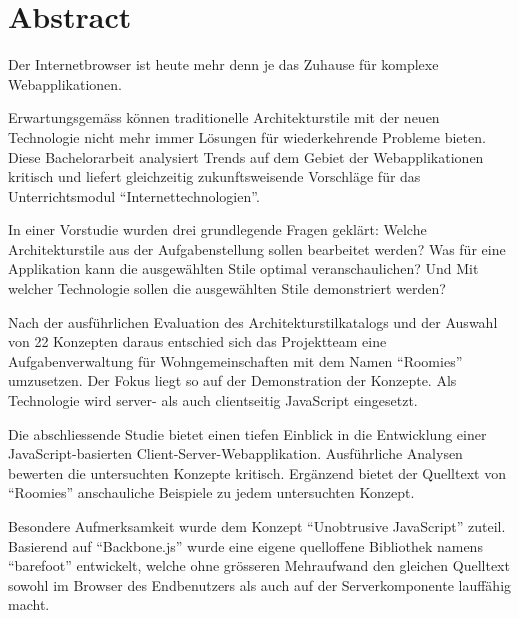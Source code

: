 \clearpage
\thispagestyle{empty}

\section*{Abstract}

Der Internetbrowser ist heute mehr denn je das Zuhause für komplexe Webapplikationen.

Erwartungsgemäss können traditionelle Architekturstile mit der neuen Technologie nicht mehr immer Lösungen für wiederkehrende Probleme bieten. Diese Bachelorarbeit analysiert Trends auf dem Gebiet der Webapplikationen kritisch und liefert gleichzeitig zukunftsweisende Vorschläge für das Unterrichtsmodul ``Internettechnologien''.

In einer Vorstudie wurden drei grundlegende Fragen geklärt: Welche Architekturstile aus der Aufgabenstellung sollen bearbeitet werden? Was für eine Applikation kann die ausgewählten Stile optimal veranschaulichen? Und Mit welcher Technologie sollen die ausgewählten Stile demonstriert werden?

Nach der ausführlichen Evaluation des Architekturstilkatalogs und der Auswahl von 22 Konzepten daraus entschied sich das Projektteam eine  Aufgabenverwaltung für Wohngemeinschaften mit dem Namen ``Roomies'' umzusetzen. Der Fokus liegt so auf der Demonstration der Konzepte. Als Technologie wird server- als auch clientseitig JavaScript eingesetzt.

Die abschliessende Studie bietet einen tiefen Einblick in die Entwicklung einer JavaScript-basierten Client-Server-Webapplikation. Ausführliche Analysen bewerten die untersuchten Konzepte kritisch. Ergänzend bietet der Quelltext von ``Roomies'' anschauliche Beispiele zu jedem untersuchten Konzept.

Besondere Aufmerksamkeit wurde dem Konzept ``Unobtrusive JavaScript'' zuteil. Basierend auf ``Backbone.js'' wurde eine eigene quelloffene Bibliothek namens ``barefoot'' entwickelt, welche ohne grösseren Mehraufwand den gleichen Quelltext sowohl im Browser des Endbenutzers als auch auf der Serverkomponente lauffähig macht.

\clearpage